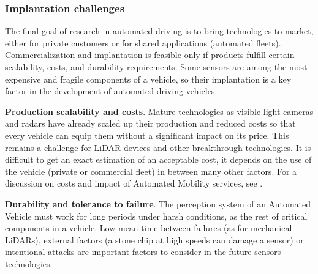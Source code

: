 

\subsubsection{Implantation challenges}

The final goal of research in automated driving is to bring technologies to
market, either for private customers or for shared applications (automated 
fleets). Commercialization and implantation is feasible only if products 
fulfill certain scalability, costs, and durability requirements.
Some sensors are among the most expensive and fragile components of a vehicle,
so their implantation is a key factor in the development of automated driving
vehicles.

\textbf{Production scalability and costs}. 
Mature technologies as visible light cameras and radars have already scaled up 
their production and reduced costs so that every vehicle can equip them without
a significant impact on its price. This remains a challenge for LiDAR devices
and other breakthrough technologies.
It is difficult to get an exact estimation of an acceptable cost, 
it depends on the use of the vehicle (private or commercial fleet)
in between many other factors. 
For a discussion on costs and impact of Automated Mobility services, see
\cite{Bosch2018}.

\textbf{Durability and tolerance to failure}.
The perception system of an Automated Vehicle must work for long
periods under harsh conditions, as the rest of critical components in a vehicle.
Low mean-time between-failures (as for mechanical LiDARs), external factors 
(a stone chip at high speeds can damage a sensor) or intentional attacks \cite{Petit2015a}
are important factors to consider in the future sensors technologies.



